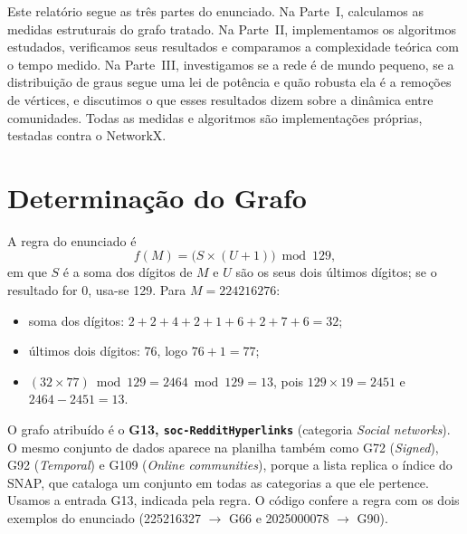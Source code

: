 \IfFileExists{webmedia.cls}{\webmediatrue\documentclass[sigconf]{webmedia}}{\documentclass[sigconf]{acmart}}
\begin{document}
Este relatório segue as três partes do enunciado. Na Parte~I, calculamos as medidas estruturais do
grafo tratado. Na Parte~II, implementamos os algoritmos estudados, verificamos seus resultados e
comparamos a complexidade teórica com o tempo medido. Na Parte~III, investigamos se a rede é de mundo
pequeno, se a distribuição de graus segue uma lei de potência e quão robusta ela é a remoções de
vértices, e discutimos o que esses resultados dizem sobre a dinâmica entre comunidades. Todas as
medidas e algoritmos são implementações próprias, testadas contra o NetworkX.

\section{Determinação do Grafo}
A regra do enunciado é
\[ f(M) = \bigl(S \times (U + 1)\bigr) \bmod 129, \]
em que $S$ é a soma dos dígitos de $M$ e $U$ são os seus dois últimos dígitos; se o resultado
for 0, usa-se 129. Para $M = 224216276$:
\begin{itemize}
  \item soma dos dígitos: $2+2+4+2+1+6+2+7+6 = 32$;
  \item últimos dois dígitos: $76$, logo $76 + 1 = 77$;
  \item $(32 \times 77) \bmod 129 = 2464 \bmod 129 = 13$, pois $129 \times 19 = 2451$ e $2464 - 2451 = 13$.
\end{itemize}
O grafo atribuído é o \textbf{G13, \texttt{soc-RedditHyperlinks}} (categoria \emph{Social networks}).
O mesmo conjunto de dados aparece na planilha também como G72 (\emph{Signed}), G92 (\emph{Temporal}) e
G109 (\emph{Online communities}), porque a lista replica o índice do SNAP, que cataloga um conjunto em
todas as categorias a que ele pertence. Usamos a entrada G13, indicada pela regra. O código confere a
regra com os dois exemplos do enunciado (225216327 $\rightarrow$ G66 e 2025000078 $\rightarrow$ G90).

\end{document}
